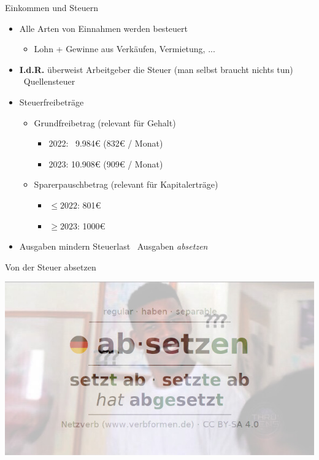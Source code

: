 \documentclass{beamer}
\begin{document}
			\begin{frame}[label={einkommen-und-steuern}]{Einkommen und Steuern}
				\begin{itemize}
					\item Alle Arten von Einnahmen werden besteuert
					\begin{itemize}
						\item Lohn + Gewinne aus Verkäufen, Vermietung, ...
					\end{itemize}
					\item \textbf{I.d.R.} überweist Arbeitgeber die Steuer (man selbst braucht nichts tun) \textrightarrow\ Quellensteuer\pause
					\item Steuerfreibeträge
					\begin{itemize}
						\item Grundfreibetrag (relevant für Gehalt)
						\begin{itemize}
							\item 2022: \ 9.984€ (832€ / Monat)
							\item 2023: 10.908€ (909€ / Monat)
						\end{itemize}
						\item Sparerpauschbetrag (relevant für Kapitalerträge)
						\begin{itemize}
							\item $\leq2022$: 801€
							\item $\geq2023$: 1000€
						\end{itemize}
					\end{itemize}\pause
					\item Ausgaben mindern Steuerlast \textrightarrow\ Ausgaben \textit{absetzen}
				\end{itemize}
			\end{frame}
		
			\begin{frame}{Von der Steuer absetzen}
				\begin{center}
					\includegraphics[width=0.75\linewidth]{images/absetzen}
				\end{center}
			\end{frame}
		
\end{document}
